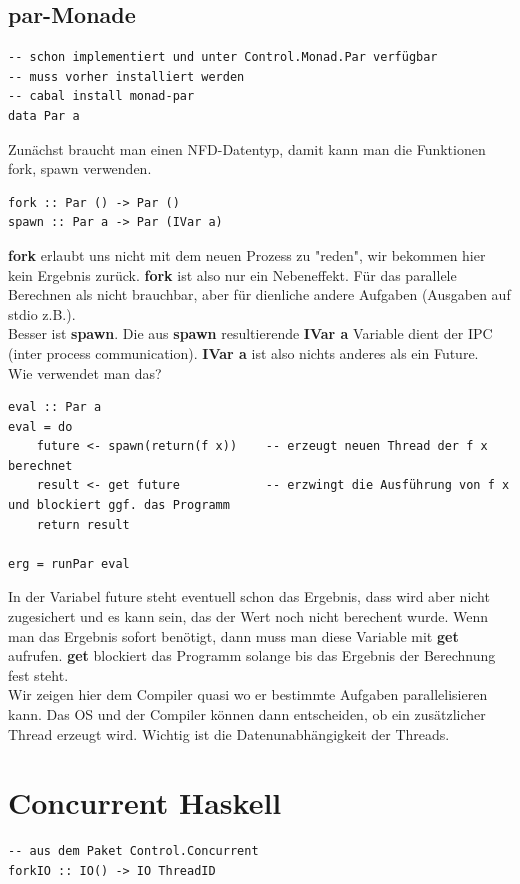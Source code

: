 \documentclass[ngerman,a4paper]{report}
\begin{document}
\subsection{par-Monade}
\begin{lstlisting}
-- schon implementiert und unter Control.Monad.Par verfügbar
-- muss vorher installiert werden
-- cabal install monad-par
data Par a
\end{lstlisting}
Zunächst braucht man einen NFD-Datentyp, damit kann man die Funktionen fork, spawn verwenden.
\begin{lstlisting}
fork :: Par () -> Par ()
spawn :: Par a -> Par (IVar a)
\end{lstlisting}
\textbf{fork} erlaubt uns nicht mit dem neuen Prozess zu "reden", wir bekommen hier kein Ergebnis zurück. \textbf{fork} ist also nur ein Nebeneffekt. Für das parallele Berechnen als nicht brauchbar, aber für dienliche andere Aufgaben (Ausgaben auf stdio z.B.).\\
Besser ist \textbf{spawn}. Die aus \textbf{spawn} resultierende \textbf{IVar a} Variable dient der IPC (inter process communication). \textbf{IVar a} ist also nichts anderes als ein Future.\\
Wie verwendet man das?
\begin{lstlisting}
eval :: Par a
eval = do
	future <- spawn(return(f x))	-- erzeugt neuen Thread der f x berechnet
	result <- get future			-- erzwingt die Ausführung von f x und blockiert ggf. das Programm
	return result

erg = runPar eval
\end{lstlisting}

In der Variabel future steht eventuell schon das Ergebnis, dass wird aber nicht zugesichert und es kann sein, das der Wert noch nicht berechent wurde. Wenn man das Ergebnis sofort benötigt, dann muss man diese Variable mit \textbf{get} aufrufen. \textbf{get} blockiert das Programm solange bis das Ergebnis der Berechnung fest steht.\\
Wir zeigen hier dem Compiler quasi wo er bestimmte Aufgaben parallelisieren kann. Das OS und der Compiler können dann entscheiden, ob ein zusätzlicher Thread erzeugt wird. Wichtig ist die Datenunabhängigkeit der Threads.\\

\section{Concurrent Haskell}
\begin{lstlisting}
-- aus dem Paket Control.Concurrent
forkIO :: IO() -> IO ThreadID
\end{lstlisting}
\end{document}
